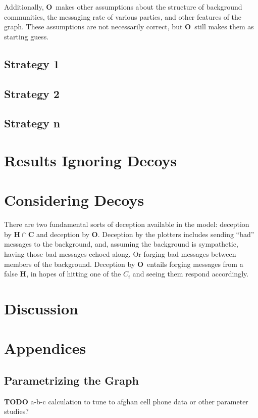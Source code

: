 \documentclass{article}
\newcommand{\Hub}[0]{\ensuremath{\mathbf{H}}}
\newcommand{\Obs}[0]{\ensuremath{\mathbf{O}}}
\begin{document}
Additionally, \Obs\ makes other assumptions about the structure of background communities, the messaging rate of various parties, and other features of the graph.  These assumptions are not necessarily correct, but \Obs\ still makes them as starting guess.

\subsection*{Strategy 1}

\subsection*{Strategy 2}

\subsection*{Strategy n}

\section*{Results Ignoring Decoys}

\section*{Considering Decoys}
There are two fundamental sorts of deception available in the model: deception by $\Hub\cap\mathbf{C}$ and deception by \Obs.  Deception by the plotters includes sending ``bad'' messages to the background, and, assuming the background is sympathetic, having those bad messages echoed along. Or forging bad messages between members of the background.  Deception by \Obs\ entails forging messages from a false \Hub, in hopes of hitting one of the $C_i$ and seeing them respond accordingly.

\section*{Discussion}

\section*{Appendices}

\subsection*{Parametrizing the Graph}
{\bf TODO} a-b-c calculation to tune to afghan cell phone data or other parameter studies?
\end{document}
